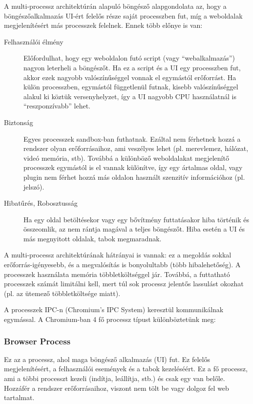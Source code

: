 \documentclass[12pt]{report}
\begin{document}
A multi-processz architektúrán alapuló böngésző alapgondolata az, hogy a böngészőalkalmazás
UI-ért felelős része saját processzben fut, míg a weboldalak megjelenítésért más
processzek felelnek. Ennek több előnye is van: \cite{bib:chromium-blog-multi-process}
\begin{description}
    \item[Felhasználói élmény]
        Előfordulhat, hogy egy weboldalon futó script (vagy ``webalkalmazás'')
        nagyon leterheli a böngészőt. Ha ez a script és a UI egy processzben fut,
        akkor ezek nagyobb valószínűséggel vonnak el egymástól erőforrást. Ha külön
        processzben, egymástól függetlenül futnak, kisebb valószínűséggel alakul ki
        köztük versenyhelyzet, így a UI nagyobb CPU használatnál is ``reszponzívabb''
        lehet.
    \item[Biztonság]
        Egyes processzek sandbox-ban futhatnak. Ezáltal nem férhetnek hozzá a rendszer
        olyan erőforrásaihoz, ami veszélyes lehet (pl. merevlemez, hálózat,
        videó memória, stb).
        Továbbá a különböző weboldalakat megjelenítő processzek egymástól is el vannak
        különítve, így egy ártalmas oldal, vagy plugin nem férhet hozzá más oldalon használt
        szenzitív információhoz (pl. jelszó).
    \item[Hibatűrés, Robosztusság]
        Ha egy oldal betöltésekor vagy egy bővítmény futtatásakor hiba történik és
        összeomlik, az nem rántja magával a teljes böngészőt. Hiba esetén a UI és más
        megnyitott oldalak, tabok megmaradnak.
    \end{description}

A multi-processz architektúrának hátrányai is vannak: ez a megoldás sokkal \\
erőforrás-igényesebb, és a megvalósítás is bonyolultabb (több hibalehetőség).
A processzek használata memória többletköltséggel jár. Továbbá, a futtatható processzek
számát limitálni kell, mert túl sok processz jelentős lassulást okozhat (pl. az ütemező
többletköltsége miatt).

A processzek IPC-n (Chromium's IPC System) keresztül kommunikálnak egymással.
A Chromium-ban 4 fő processz típust különböztetünk meg:

\subsubsection{Browser Process}
Ez az a processz, ahol maga böngésző alkalmazás (UI) fut. Ez felelős megjelenítésért,
a felhasználói események és a tabok kezeléséért. Ez a fő processz, ami a többi processzt
kezeli (indítja, leállítja, stb.) és csak egy van belőle. Hozzáfér a rendszer erőforrásaihoz,
viszont nem tölt be vagy dolgoz fel web tartalmat.
\end{document}

